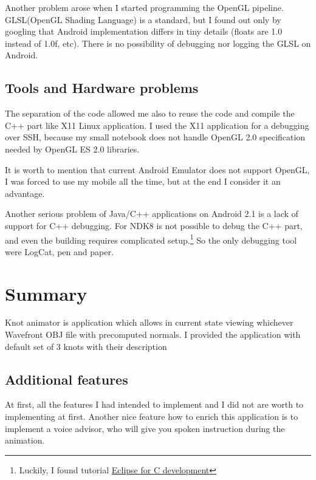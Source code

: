 Another problem arose when I started programming the OpenGL pipeline.
GLSL(OpenGL Shading Language) is a standard, 
but I found out  only by googling
that Android implementation differs in tiny details (floats are 1.0 instead of 1.0f, etc).
There is no possibility of debugging nor logging the GLSL on Android.

\subsection*{Tools and Hardware problems} %
The separation of the code allowed me also to reuse the code and compile 
the C++ part like X11 Linux application. I used the X11 application for a debugging
over SSH, because my small notebook does not handle OpenGL 2.0 specification
needed by OpenGL ES 2.0 libraries.

It is worth to mention that current Android Emulator does not support OpenGL, 
I was forced to use my mobile all the time, 
but at the end I consider it an advantage.

Another serious problem of Java/C++ applications on Android 2.1 is a lack of support for C++ debugging.
For NDK8 is not possible to debug the C++ part, 
and even the building requires complicated setup.\footnote{Luckily, I found tutorial \href{http://mhandroid.wordpress.com/2011/01/23/using-eclipse-for-android-cc-development/}{Eclipse for C development} }
So the only debugging tool were LogCat, pen and paper.

\section{Summary} %
\label{sec:Summary}
Knot animator is application which allows in current state viewing whichever Wavefront OBJ file
with precomputed normals. I provided the application with default set of 3 knots with their description

\subsection*{Additional features} %
\label{sec:Additional freatures}
At first, all the features I had intended to implement and I did not are worth to implementing at first.
Another nice feature how to enrich this application is to implement
a voice advisor, who will give you spoken instruction during the animation.

